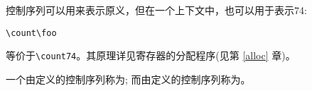 \documentclass{book}
\begin{document}
\begin{itemize}
控制序列可以用来表示原义，但在一个上下文中，也可以用于表示74:

\begin{verbatim}
\count\foo
\end{verbatim}

等价于\verb=\count74=。其原理详见寄存器的分配程序(见第 \ref{alloc} 章)。


一个由定义的控制序列称为;
而由定义的控制序列称为。

\end{itemize}
\end{document}

